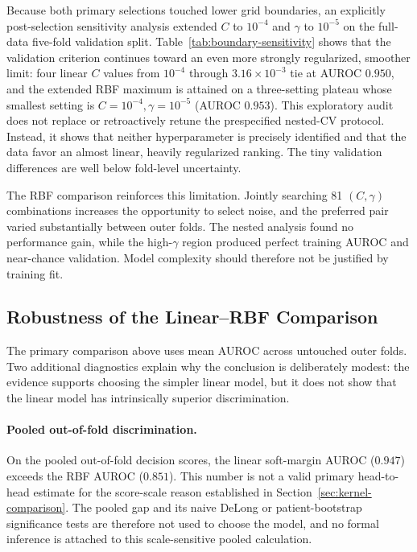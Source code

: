 \documentclass[11pt,a4paper]{article}
\numberwithin{equation}{section} %
\begin{document}
Because both primary selections touched lower grid boundaries, an explicitly
post-selection sensitivity analysis extended $C$ to $10^{-4}$ and $\gamma$ to
$10^{-5}$ on the full-data five-fold validation split. Table~\ref{tab:boundary-sensitivity}
shows that the validation criterion continues toward an even more strongly
regularized, smoother limit: four linear $C$ values from $10^{-4}$ through
$3.16\times10^{-3}$ tie at AUROC $0.950$, and the extended RBF maximum is
attained on a three-setting plateau whose smallest setting is
$C=10^{-4},\gamma=10^{-5}$ (AUROC $0.953$). This exploratory audit does not
replace or retroactively retune the prespecified nested-CV protocol. Instead,
it shows that neither hyperparameter is precisely identified and that the
data favor an almost linear, heavily regularized ranking. The tiny validation
differences are well below fold-level uncertainty.

\begin{table}[htbp]
\centering
\caption{Post-selection lower-bound sensitivity check. The primary choices
remain the prespecified-grid results used in nested validation.}
\label{tab:boundary-sensitivity}
\scriptsize
\resizebox{\textwidth}{!}{}
\end{table}

The RBF comparison reinforces this limitation. Jointly searching 81
$(C,\gamma)$ combinations increases the opportunity to select noise, and the
preferred pair varied substantially between outer folds. The nested analysis
found no performance gain, while the high-$\gamma$ region produced perfect
training AUROC and near-chance validation. Model complexity should therefore
not be justified by training fit.

\subsection{Robustness of the Linear--RBF Comparison}
\label{sec:stat-comparison}

The primary comparison above uses mean AUROC across untouched outer folds.
Two additional diagnostics explain why the conclusion is deliberately modest:
the evidence supports choosing the simpler linear model, but it does not show
that the linear model has intrinsically superior discrimination.

\paragraph{Pooled out-of-fold discrimination.}
On the pooled out-of-fold decision scores, the linear soft-margin AUROC
($0.947$) exceeds the RBF AUROC ($0.851$). This number is not a valid primary
head-to-head estimate for the score-scale reason established in
Section~\ref{sec:kernel-comparison}. The pooled gap and its naive DeLong or
patient-bootstrap significance tests are therefore not used to choose the
model, and no formal inference is attached to this scale-sensitive pooled
calculation.
\end{document}
